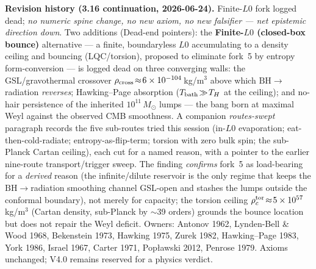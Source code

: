 \documentclass[11pt]{article}
\newcommand{\msun}{M_\odot}
\begin{document}
{\smallskip\noindent\textbf{Revision history (3.16 continuation, 2026-06-24).} Finite-$L0$ fork logged dead; \emph{no numeric spine change, no new axiom, no new falsifier --- net epistemic direction down}. Two additions (Dead-end pointers): the \textbf{Finite-$L0$ (closed-box bounce)} alternative --- a finite, boundaryless $L0$ accumulating to a density ceiling and bouncing (LQC/torsion), proposed to eliminate fork~5 by entropy form-conversion --- is logged dead on three converging walls: the GSL/gravothermal crossover $\rho_{\rm cross}\!\approx\!6\times10^{-104}$\,kg/m$^3$ above which $\mathrm{BH}\!\to\!$radiation \emph{reverses}; Hawking--Page absorption ($T_{\rm bath}\!\gg\!T_H$ at the ceiling); and no-hair persistence of the inherited $10^{11}\,\msun$ lumps --- the bang born at maximal Weyl against the observed CMB smoothness. A companion \emph{routes-swept} paragraph records the five sub-routes tried this session (in-$L0$ evaporation; eat-then-cold-radiate; entropy-as-flip-term; torsion with zero bulk spin; the sub-Planck Cartan ceiling), each cut for a named reason, with a pointer to the earlier nine-route transport/trigger sweep. The finding \emph{confirms} fork~5 as load-bearing for a \emph{derived} reason (the infinite/dilute reservoir is the only regime that keeps the $\mathrm{BH}\!\to\!$radiation smoothing channel GSL-open and stashes the lumps outside the conformal boundary), not merely for capacity; the torsion ceiling $\rho_c^{\rm tor}\!\approx\!5\times10^{57}$\,kg/m$^3$ (Cartan density, sub-Planck by $\sim$39 orders) grounds the bounce location but does not repair the Weyl deficit. Owners: Antonov 1962, Lynden-Bell \& Wood 1968, Bekenstein 1973, Hawking 1975, Zurek 1982, Hawking--Page 1983, York 1986, Israel 1967, Carter 1971, Pop\l{}awski 2012, Penrose 1979. Axioms unchanged; V4.0 remains reserved for a physics verdict.

}
\end{document}
